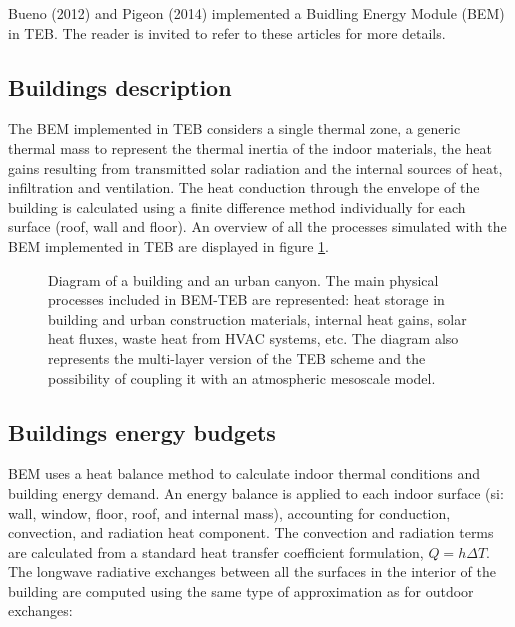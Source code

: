 Bueno \etal (2012)\nocite{bueno2012} and Pigeon \etal (2014)\nocite{Pigeon2014} implemented a Buidling Energy Module (BEM) in TEB. The reader is invited to refer to these articles for more details. \\

\subsection{Buildings description}

The BEM implemented in TEB considers a single thermal zone, a generic thermal mass to represent the thermal inertia of the indoor materials, the heat gains resulting from transmitted solar radiation and the internal sources of heat, infiltration and ventilation.  The heat conduction through the envelope of the building is calculated using a finite difference method individually for each surface (roof, wall and floor). An overview of all the processes simulated with the BEM implemented in TEB are displayed in figure \ref{BEM}. \\

\begin{figure}[t]
\hspace*{0.cm}
\caption{Diagram of a building and an urban canyon.  The main physical processes included in BEM-TEB are represented:  heat storage in building and urban construction materials, internal heat gains, solar heat fluxes, waste heat from HVAC systems, etc.  The diagram also represents the multi-layer version of the TEB scheme and the possibility of coupling it with an atmospheric mesoscale model.}
\label{BEM}
\end{figure}




\subsection{Buildings energy budgets}

BEM uses a heat balance method to calculate indoor thermal conditions and building energy demand.  An energy balance is  applied  to  each  indoor  surface  (si:  wall,  window,  floor, roof, and internal mass), accounting for conduction, convection, and radiation heat component. The  convection  and  radiation  terms  are  calculated  from  a standard heat transfer coefficient formulation, $Q=h\Delta T$. \\

The longwave radiative exchanges between all the surfaces in the interior of the building are computed using the same type of approximation as for outdoor exchanges:

